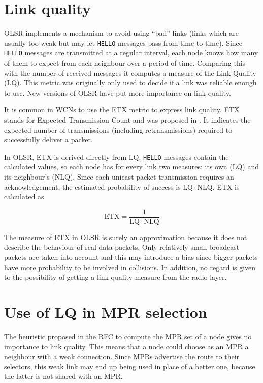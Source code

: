 \documentclass[a4paper,11pt,twoside,openright]{memoir}
\newcommand{\etx}{\mathrm{ETX}}
\newcommand{\linkq}{\mathrm{LQ}}
\newcommand{\nlq}{\mathrm{NLQ}}
\begin{document}
\section{Link quality}\label{link-quality}

OLSR implements a mechanism to avoid using ``bad'' links (links which
are usually too weak but may let \texttt{HELLO} messages pass from time
to time). Since \texttt{HELLO} messages are transmitted at a regular
interval, each node knows how many of them to expect from each neighbour
over a period of time. Comparing this with the number of received
messages it computes a measure of the Link Quality (LQ). This metric was
originally only used to decide if a link was reliable enough to use. New
versions of OLSR have put more importance on link quality.

It is common in WCNs to use the ETX metric to express link quality. ETX
stands for Expected Transmission Count and was proposed in
\cite{de_couto_high-throughput_2004}.
It indicates the expected number of transmissions (including
retransmissions) required to successfully deliver a packet.

In OLSR, ETX is derived directly from LQ. \texttt{HELLO} messages
contain the calculated values, so each node has for every link two
measures: its own (LQ) and its neighbour's (NLQ). Since each unicast packet
transmission requires an acknowledgement, the estimated probability of
success is $\linkq \cdot \nlq$. ETX is calculated as

\begin{equation}
\etx = \frac{1}{\linkq \cdot \nlq}
\end{equation}

The measure of ETX in OLSR is surely an approximation because it does not
describe the behaviour of real data packets. Only relatively small broadcast
packets are taken into account and this may introduce a bias since bigger
packets have more probability to be involved in collisions.
In addition, no regard is given to the possibility of getting a link quality
measure from the radio layer.

\section{Use of LQ in MPR selection}\label{use-of-lq-in-mpr-selection}

The heuristic proposed in the RFC to compute the MPR set of a node gives
no importance to link quality. This means that a node could choose as an
MPR a neighbour with a weak connection. Since MPRs advertise the route
to their selectors, this weak link may end up being used in place of a
better one, because the latter is not shared with an MPR.
\end{document}
